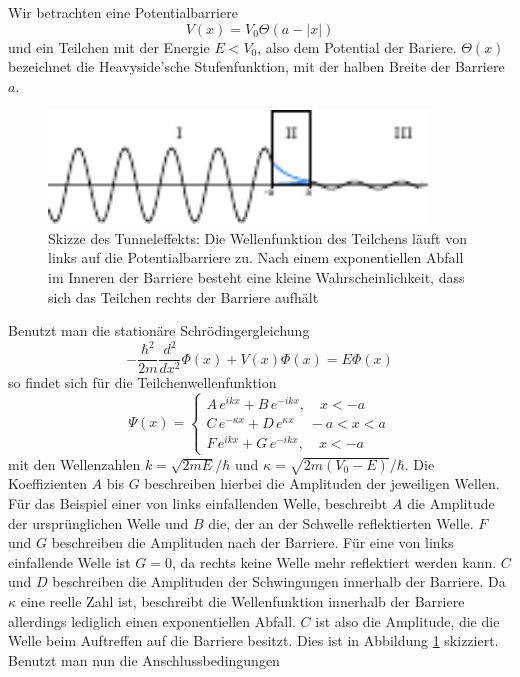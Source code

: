 Wir betrachten eine Potentialbarriere 
\[
    V(x) = V_0 \Theta ( a - |x| )    
\]
und ein Teilchen mit der Energie $E < V_0$, also dem Potential der Bariere. $\Theta(x)$ bezeichnet die Heavyside'sche Stufenfunktion, mit der halben Breite der Barriere $a$.
\begin{figure}
   \centering
   \includegraphics[width=0.9\textwidth]{Abb/tunnel.pdf}
   \caption{Skizze des Tunneleffekts: Die Wellenfunktion des Teilchens läuft von 
            links auf die Potentialbarriere zu. Nach einem exponentiellen Abfall
            im Inneren der Barriere besteht eine kleine Wahrscheinlichkeit, dass
            sich das Teilchen rechts der Barriere aufhält}
   \label{tunnel} 
\end{figure}
Benutzt man die stationäre Schrödingergleichung
\[
    - \frac{\hbar^2}{2m} \frac{d^2}{dx^2} \Phi(x) + V(x) \Phi(x)
    = E \Phi(x)    
\]
so findet sich für die Teilchenwellenfunktion
\[
    \Psi(x) = 
        \begin{cases}
            A \, e^{ikx} + B \, e^{-ikx}, \quad x<-a\\
            C \, e^{-\kappa x} + D \, e^{\kappa x} \quad -a < x < a\\
            F \, e^{ikx} + G \, e^{-ikx}, \quad x<-a
        \end{cases}
\]
mit den Wellenzahlen $k=\sqrt{2mE}/\hbar$ und $\kappa = \sqrt{2m(V_0-E)}/\hbar$.
Die Koeffizienten $A$ bis $G$ beschreiben hierbei die Amplituden der jeweiligen
Wellen. Für das Beispiel einer von links einfallenden Welle, beschreibt $A$ die
Amplitude der ursprünglichen Welle und $B$ die, der an der Schwelle reflektierten
Welle. $F$ und $G$ beschreiben die Amplituden nach der Barriere. Für eine von links
einfallende Welle ist $G=0$, da rechts keine Welle mehr reflektiert werden kann.
$C$ und $D$ beschreiben die Amplituden der 
Schwingungen innerhalb der Barriere. Da $\kappa$ eine reelle Zahl ist, beschreibt 
die Wellenfunktion innerhalb der Barriere allerdings lediglich einen exponentiellen
Abfall. $C$ ist also die Amplitude, die die Welle beim Auftreffen auf die Barriere
besitzt.
Dies ist in Abbildung \ref{tunnel} skizziert.
Benutzt man nun die Anschlussbedingungen
